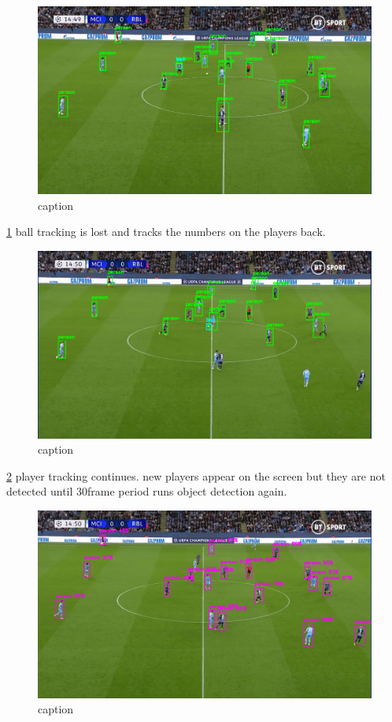 \documentclass[
11pt,
twoside
]{report}
\begin{document}
\begin{figure}[H]
    \includegraphics[keepaspectratio, width=\columnwidth]{Screenshot_2022-03-03_21-35-39.png}
    \caption{caption}
    \label{img:3}
\end{figure}
\ref{img:3} ball tracking is lost and tracks the numbers on the players back.
\begin{figure}[H]
    \includegraphics[keepaspectratio, width=\columnwidth]{Screenshot_2022-03-03_21-36-05.png}
    \caption{caption}
    \label{img:4}
\end{figure}
\ref{img:4} player tracking continues. new players appear on the screen but they are not
detected until 30frame period runs object detection again.
\begin{figure}[H]
    \includegraphics[keepaspectratio, width=\columnwidth]{Screenshot_2022-03-03_21-38-04.png}
    \caption{caption}
    \label{img:5}
\end{figure}
\end{document}
